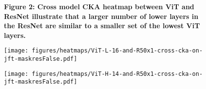 \documentclass{article}
\begin{document}
\begin{figure}
    \centering
    \begin{gridlayout}{\linewidth}{7cm}
        \begin{row}{1}
            \begin{cell}{0.444}
            \textbf{Figure 2: Cross model CKA heatmap between ViT and ResNet illustrate that a larger number of lower layers in the ResNet are similar to a smaller set of the lowest ViT layers.}
          \end{cell}
          \begin{cell}{0.278}
                \centering
                \texttt{[image: figures/heatmaps/ViT-L-16-and-R50x1-cross-cka-on-jft-maskresFalse.pdf]}
            \end{cell}
            \begin{cell}{0.277}
                \centering
                \texttt{[image: figures/heatmaps/ViT-H-14-and-R50x1-cross-cka-on-jft-maskresFalse.pdf]}
            \end{cell}
        \end{row}
    \end{gridlayout}
    \label{fig:representation-cross-comparisons}
\end{figure}

\end{document}
